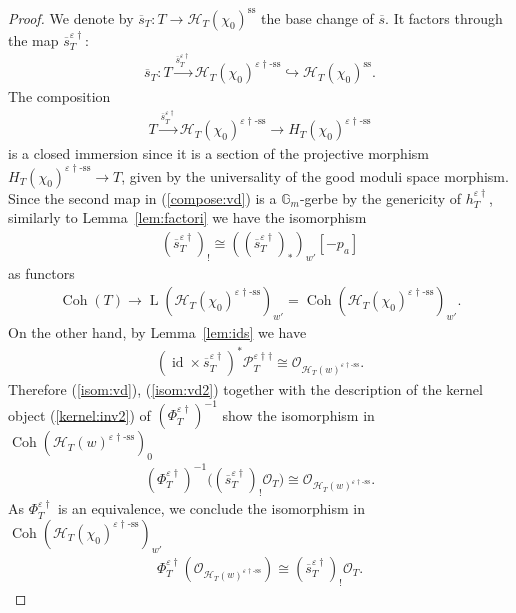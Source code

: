 \documentclass[11pt,oneside,a4paper,mathscr]{amsart}
\theoremstyle{definition}
\newcommand{\LL}{\operatorname{L}}
\newcommand{\cH}{\mathcal{H}}
\newcommand{\cP}{\mathcal{P}}
\newcommand{\cO}{\mathcal{O}}
\newcommand{\Coh}{\operatorname{Coh}}
\newcommand{\id}{\operatorname{id}}
\newcommand{\vd}{\varepsilon\dag}
\newcommand{\vdss}{\varepsilon\dag\text{-ss}}
\begin{document}
\begin{proof}
We denote by
$\overline{s}_T \colon T \to \cH_T(\chi_0)^{\mathrm{ss}}$
the base change of $\overline{s}$.
It factors through the map $\overline{s}_T^{\vd}$:
\begin{align*}
    \overline{s}_T \colon
    T
    \stackrel{\overline{s}_T^{\vd}}{\to}
    \cH_T(\chi_0)^{\vdss}
    \hookrightarrow
    \cH_T(\chi_0)^{\mathrm{ss}}.
\end{align*}
The composition 
\begin{align}\label{compose:vd}
T\stackrel{\overline{s}_T^{\vd}}{\to} \cH_T(\chi_0)^{\vd\text{-ss}} \to H_T(\chi_0)^{\vd\text{-ss}} 
\end{align}
is a closed immersion since it is a section of the projective morphism 
$H_T(\chi_0)^{\vd\text{-ss}}  \to T$, given by the universality of the good moduli space morphism. Since the second map in (\ref{compose:vd}) is a $\mathbb{G}_m$-gerbe by the genericity of $h_T^{\vd}$, similarly to Lemma~\ref{lem:factori}
we have the isomorphism
\begin{align}\label{isom:vd}
    (\overline{s}_{T}^{\vd})_{!}\cong ((\overline{s}_{T}^{\vd})_{*})_{w'}[-p_a]
\end{align}
as functors 
\begin{align*}
    \Coh(T) \to \LL(\cH_T(\chi_0)^{\vd\text{-ss}})_{w'} =
    \Coh(\cH_T(\chi_0)^{\vd\text{-ss}})_{w'}.
\end{align*}
On the other hand, by Lemma~\ref{lem:ids} we have 
\begin{align}\label{isom:vd2}
    (\id \times \overline{s}_T^{\vd})^* \cP_T^{\vd\dag}\cong 
    \cO_{\cH_T(w)^{\vd\text{-ss}}}.
\end{align}
Therefore (\ref{isom:vd}), (\ref{isom:vd2}) together with the description of the kernel object (\ref{kernel:inv2})
of $(\Phi_T^{\vd})^{-1}$
show the isomorphism in $\Coh(\cH_T(w)^{\vd\text{-ss}})_0$
\begin{align*}
 (\Phi_T^{\vd})^{-1}
 \bigl(
 (\overline{s}_T^{\vd})_{!}\mathcal{O}_T
 \bigr)
 \cong
 \mathcal{O}_{\cH_T(w)^{\vdss}}.
\end{align*}
As $\Phi_T^{\vd}$ is an equivalence, we conclude the isomorphism 
in $\Coh(\cH_T(\chi_0)^{\vd\text{-ss}})_{w'}$
\begin{align*}
    \Phi_T^{\vd}
    (\mathcal{O}_{\cH_T(w)^{\vdss}})
    \cong
    (\overline{s}_T^{\vd})_{!}\mathcal{O}_T.
\end{align*}


\end{proof}
\end{document}
